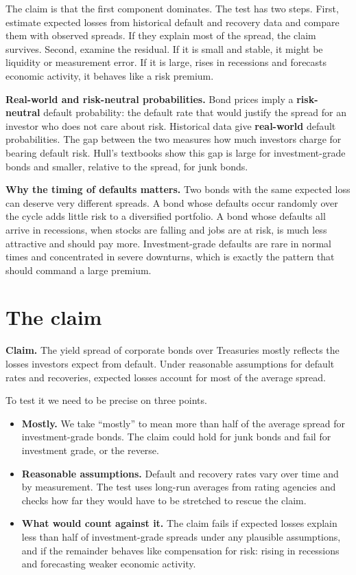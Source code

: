 The claim is that the first component dominates. The test has two steps. First, estimate expected losses from historical default and recovery data and compare them with observed spreads. If they explain most of the spread, the claim survives. Second, examine the residual. If it is small and stable, it might be liquidity or measurement error. If it is large, rises in recessions and forecasts economic activity, it behaves like a risk premium.

\textbf{Real-world and risk-neutral probabilities.} Bond prices imply a \textbf{risk-neutral} default probability: the default rate that would justify the spread for an investor who does not care about risk. Historical data give \textbf{real-world} default probabilities. The gap between the two measures how much investors charge for bearing default risk. Hull's textbooks show this gap is large for investment-grade bonds and smaller, relative to the spread, for junk bonds.

\textbf{Why the timing of defaults matters.} Two bonds with the same expected loss can deserve very different spreads. A bond whose defaults occur randomly over the cycle adds little risk to a diversified portfolio. A bond whose defaults all arrive in recessions, when stocks are falling and jobs are at risk, is much less attractive and should pay more. Investment-grade defaults are rare in normal times and concentrated in severe downturns, which is exactly the pattern that should command a large premium.

\section{The claim}
\label{sec:18-claim}

\begin{callout}
\textbf{Claim.} The yield spread of corporate bonds over Treasuries mostly reflects the losses investors expect from default. Under reasonable assumptions for default rates and recoveries, expected losses account for most of the average spread.
\end{callout}

To test it we need to be precise on three points.

\begin{itemize}
  \item \textbf{Mostly.} We take ``mostly'' to mean more than half of the average spread for investment-grade bonds. The claim could hold for junk bonds and fail for investment grade, or the reverse.
  \item \textbf{Reasonable assumptions.} Default and recovery rates vary over time and by measurement. The test uses long-run averages from rating agencies and checks how far they would have to be stretched to rescue the claim.
  \item \textbf{What would count against it.} The claim fails if expected losses explain less than half of investment-grade spreads under any plausible assumptions, and if the remainder behaves like compensation for risk: rising in recessions and forecasting weaker economic activity.
\end{itemize}


